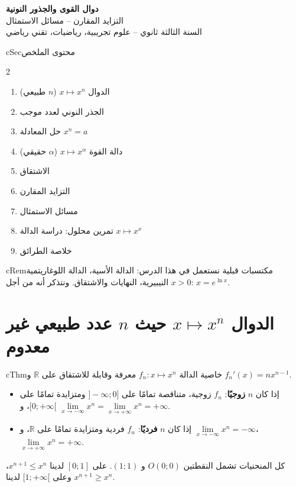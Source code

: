 \documentclass[12pt,a4paper]{article}
\newenvironment{BOX}[2]{\begin{otherlanguage}{english}\begin{arbox}{#1}{#2}}{\end{arbox}\end{otherlanguage}}
\newenvironment{khassia}[1][خاصية]{\begin{BOX}{cThm}{#1}}{\end{BOX}}
\newenvironment{molahada}[1][ملاحظة]{\begin{BOX}{cRem}{#1}}{\end{BOX}}
\newenvironment{LTR}{\begin{otherlanguage}{english}}{\end{otherlanguage}}
\newcommand{\R}{\mathbb{R}}
\begin{document}
\begin{LTR}
\begin{tcolorbox}[enhanced,colback=cSec,colframe=cSec,arc=3mm,halign=center,boxrule=0pt,top=12pt,bottom=12pt,before upper={\selectlanguage{arabic}}]
{\color{white}\fontsize{26}{32}\selectfont\bfseries دوال القوى والجذور النونية}\\[8pt]
{\color{white}\large التزايد المقارن -- مسائل الاستمثال}\\[5pt]
{\color{white}\large السنة الثالثة ثانوي -- علوم تجريبية، رياضيات، تقني رياضي}
\end{tcolorbox}
\end{LTR}

\begin{BOX}{cSec}{محتوى الملخص}
\begin{multicols}{2}
\begin{enumerate}[label=\arabic*.]
\item الدوال $x\mapsto x^{n}$ ($n$ طبيعي)
\item الجذر النوني لعدد موجب
\item حل المعادلة $x^{n}=a$
\item دالة القوة $x\mapsto x^{\alpha}$ ($\alpha$ حقيقي)
\item الاشتقاق
\item التزايد المقارن
\item مسائل الاستمثال
\item تمرين محلول: دراسة الدالة $x\mapsto x^{x}$
\item خلاصة الطرائق
\end{enumerate}
\end{multicols}
\end{BOX}

\begin{molahada}[مكتسبات قبلية]
نستعمل في هذا الدرس: الدالة الأسية، الدالة اللوغاريتمية النيبيرية، النهايات والاشتقاق. ونتذكر أنه من أجل $x>0$: $x=e^{\ln x}$.
\end{molahada}

\section{الدوال $x\mapsto x^{n}$ حيث $n$ عدد طبيعي غير معدوم}
\begin{khassia}
الدالة $f_n:x\mapsto x^{n}$ معرفة وقابلة للاشتقاق على $\R$ و $f_n'(x)=nx^{n-1}$.
\begin{itemize}
\item إذا كان $n$ \textbf{زوجيًا}: $f_n$ زوجية، متناقصة تمامًا على $]-\infty;0]$ ومتزايدة تمامًا على $[0;+\infty[$، و $\lim\limits_{x\to-\infty}x^{n}=\lim\limits_{x\to+\infty}x^{n}=+\infty$.
\item إذا كان $n$ \textbf{فرديًا}: $f_n$ فردية ومتزايدة تمامًا على $\R$، و $\lim\limits_{x\to-\infty}x^{n}=-\infty$، $\lim\limits_{x\to+\infty}x^{n}=+\infty$.
\end{itemize}
كل المنحنيات تشمل النقطتين $O(0;0)$ و $(1;1)$. على $[0;1]$ لدينا $x^{n+1}\leqslant x^{n}$، وعلى $[1;+\infty[$ لدينا $x^{n+1}\geqslant x^{n}$.
\end{khassia}
\end{document}
